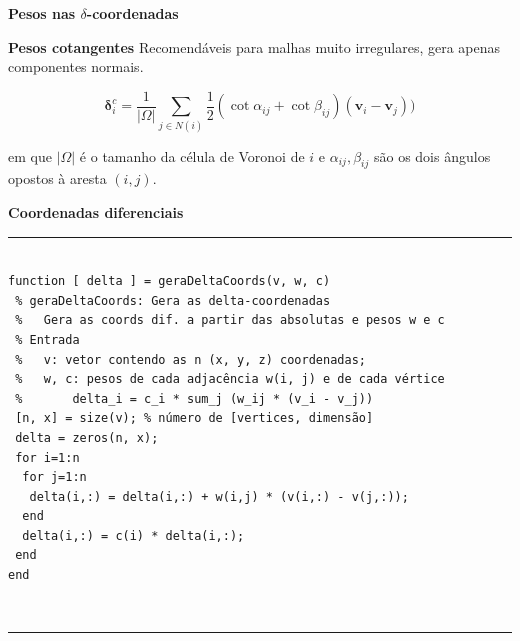 \begin{frame}{{\bf \color{blue} Pesos nas $\delta$-coordenadas}}
\begin{block}{\bf Pesos cotangentes}
Recomendáveis para malhas muito irregulares, gera apenas componentes normais.

$$\mathbf{\delta}_i^c = \frac{1}{|\Omega|} \sum_{j \in N(i)} \frac{1}{2} (\cot \alpha_{ij} + \cot \beta_{ij})(\mathbf{v}_i - \mathbf{v}_j))$$

\noindent em que $|\Omega|$ é o tamanho da célula de Voronoi de $i$ e $\alpha_{ij}, \beta_{ij}$ são os dois ângulos opostos à aresta $(i, j)$.
\end{block}
\end{frame}

\begin{frame}[fragile]{{\bf \color{blue} Coordenadas diferenciais}}
\begin{Codigo}
\noindent\rule{11.2cm}{1.pt}
\vspace{-0.2cm}
\begin{verbatim}
	
function [ delta ] = geraDeltaCoords(v, w, c)
 % geraDeltaCoords: Gera as delta-coordenadas
 %   Gera as coords dif. a partir das absolutas e pesos w e c
 % Entrada
 %   v: vetor contendo as n (x, y, z) coordenadas;
 %   w, c: pesos de cada adjacência w(i, j) e de cada vértice
 %       delta_i = c_i * sum_j (w_ij * (v_i - v_j))
 [n, x] = size(v); % número de [vertices, dimensão]
 delta = zeros(n, x);
 for i=1:n
  for j=1:n
   delta(i,:) = delta(i,:) + w(i,j) * (v(i,:) - v(j,:));
  end
  delta(i,:) = c(i) * delta(i,:);
 end
end
\end{verbatim}\\
\vspace{-0.5cm}
\noindent\rule{11.2cm}{1.pt}\\
\end{Codigo}	
\end{frame}

